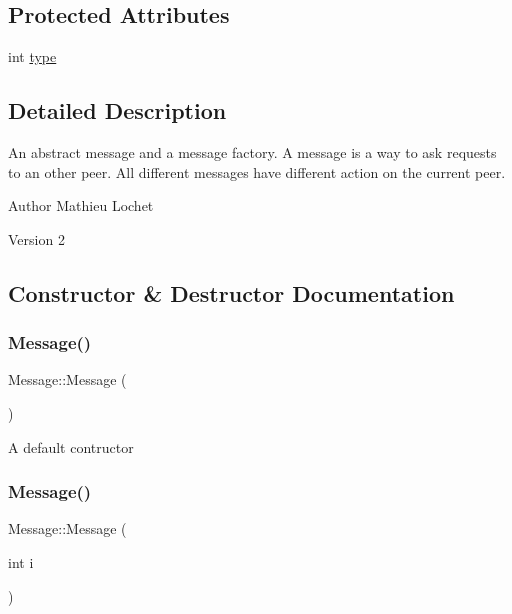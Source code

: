 \subsection*{Protected Attributes}
\begin{DoxyCompactItemize}
\item 
int \mbox{\hyperlink{classMessage_afbfb481c98b13d0deba0bac443bebe29}{type}}
\end{DoxyCompactItemize}


\subsection{Detailed Description}
An abstract message and a message factory. A message is a way to ask requests to an other peer. All different messages have different action on the current peer.

\begin{DoxyAuthor}{Author}
Mathieu Lochet 
\end{DoxyAuthor}
\begin{DoxyVersion}{Version}
2 
\end{DoxyVersion}


\subsection{Constructor \& Destructor Documentation}
\mbox{\label{classMessage_a4fc4f717b634e66070366cb7722d7761}} 
\subsubsection{\texorpdfstring{Message()}{Message()}\hspace{0.1cm}{\footnotesize\ttfamily [1/2]}}
{\footnotesize\ttfamily Message\+::\+Message (\begin{DoxyParamCaption}{ }\end{DoxyParamCaption})\hspace{0.3cm}{\ttfamily [default]}}

A default contructor \mbox{\label{classMessage_a6819ef42fb87c15b413b142eb96fe536}} 
\subsubsection{\texorpdfstring{Message()}{Message()}\hspace{0.1cm}{\footnotesize\ttfamily [2/2]}}
{\footnotesize\ttfamily Message\+::\+Message (\begin{DoxyParamCaption}\item[{int}]{i }\end{DoxyParamCaption})\hspace{0.3cm}{\ttfamily [explicit]}}

